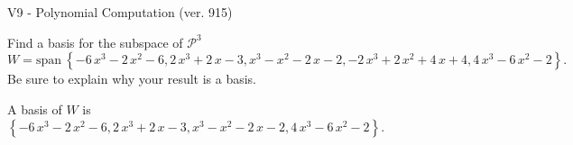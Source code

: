\begin{exercise}
  \begin{exerciseTitle}V9 - Polynomial Computation (ver. 915)\end{exerciseTitle}
  \begin{exerciseStatement}
    Find a basis for the subspace of \(\mathcal{P}^3\) 
\[W=\mathrm{span}\ \left\{-6 \, x^{3} - 2 \, x^{2} - 6 , 2 \, x^{3} + 2 \, x - 3 , x^{3} - x^{2} - 2 \, x - 2 , -2 \, x^{3} + 2 \, x^{2} + 4 \, x + 4 , 4 \, x^{3} - 6 \, x^{2} - 2\right\}.\]
 Be sure to explain why your result is a basis.


  \end{exerciseStatement}
  \begin{exerciseAnswer}
   A basis of \(W\) is  \(\left\{-6 \, x^{3} - 2 \, x^{2} - 6 , 2 \, x^{3} + 2 \, x - 3 , x^{3} - x^{2} - 2 \, x - 2 , 4 \, x^{3} - 6 \, x^{2} - 2\right\}\).
  


  \end{exerciseAnswer}
\end{exercise}